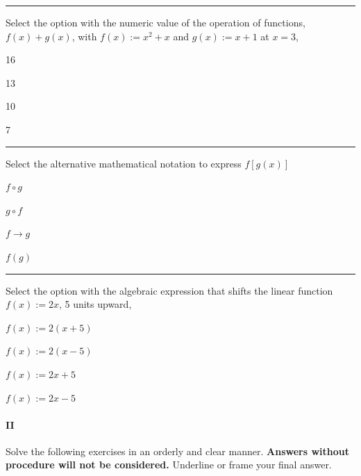 \begin{preguntas}
\pregunta[5] \rule{1cm}{0.1mm} Select the option with the numeric value of the operation of functions, $f(x) + g(x)$, with $f(x):= x^2 + x$ and $g(x):=x+1$ at $x=3$,

\begin{enumerate*}[label=(\alph*)]
    \item 16 $\qquad$
    \item 13 $\qquad$
    \item 10 $\qquad$
    \item 7 $\qquad$
\end{enumerate*}

\pregunta[5] \rule{1cm}{0.1mm} Select the alternative mathematical notation to express $f[g(x)]$

\begin{enumerate*}[label=(\alph*)]
    \item $f\circ g\qquad$
    \item $g\circ f\qquad$
    \item $f\to g\qquad$
    \item $f(g)\qquad$
\end{enumerate*}

\pregunta[5] \rule{1cm}{0.1mm} Select the option with the algebraic expression that shifts the linear function $f(x):=2x$, 5 units upward,

\begin{enumerate*}[label=(\alph*)]
    \item $f(x):=2(x+5)\qquad$
    \item $f(x):=2(x-5)\qquad$
    \item $f(x):=2x+5\qquad$
    \item $f(x):=2x-5\qquad$
\end{enumerate*}


\end{preguntas}

\newpage

\paragraph{II} Solve the following exercises in an orderly and clear manner. 
\textbf{Answers without procedure will not be considered.}
Underline or frame your final answer.

